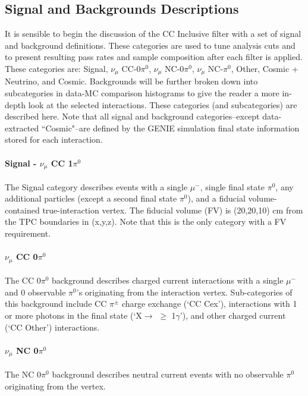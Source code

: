 \subsection{Signal and Backgrounds Descriptions}
\par It is sensible to begin the discussion of the CC Inclusive filter with a set of signal and background definitions.  These categories are used to tune analysis cuts and to present resulting pass rates and sample composition after each filter is applied.  These categories are: Signal, $\nu_\mu$ CC-0$\pi^0$, $\nu_\mu$ NC-0$\pi^0$, $\nu_\mu$ NC-$\pi^0$, Other, Cosmic + Neutrino, and Cosmic. Backgrounds will be further broken down into subcategories in data-MC comparison histograms to give the reader a more in-depth look at the selected interactions.  These categories (and subcategories) are described here. Note that all signal and background categories--except data-extracted ``Cosmic"--are defined by the GENIE simulation final state information stored for each interaction.

\paragraph{Signal - $\nu_\mu$ CC 1$\pi^0$} The Signal category describes events with a single $\mu^-$, single final state $\pi^0$, any additional particles (except a second final state $\pi^0$), and a fiducial volume-contained true-interaction vertex. The fiducial volume (FV) is (20,20,10) cm from the TPC boundaries in (x,y,z). Note that this is the only category with a FV requirement.

\paragraph{ $\nu_\mu$ CC 0$\pi^0$}
The CC 0$\pi^0$ background describes charged current interactions with a single $\mu^-$ and 0 observable $\pi^0$'s originating from the interaction vertex.  Sub-categories of this background include CC $\pi^{\pm}$ charge exchange (`CC Cex'), interactions with 1 or more photons in the final state (`X$\rightarrow$ $\geq$ 1$\gamma$'), and other charged current (`CC Other') interactions. 

\paragraph{  $\nu_\mu$ NC 0$\pi^0$}
The NC 0$\pi^0$ background describes neutral current events with no observable $\pi^0$ originating from the vertex.  


